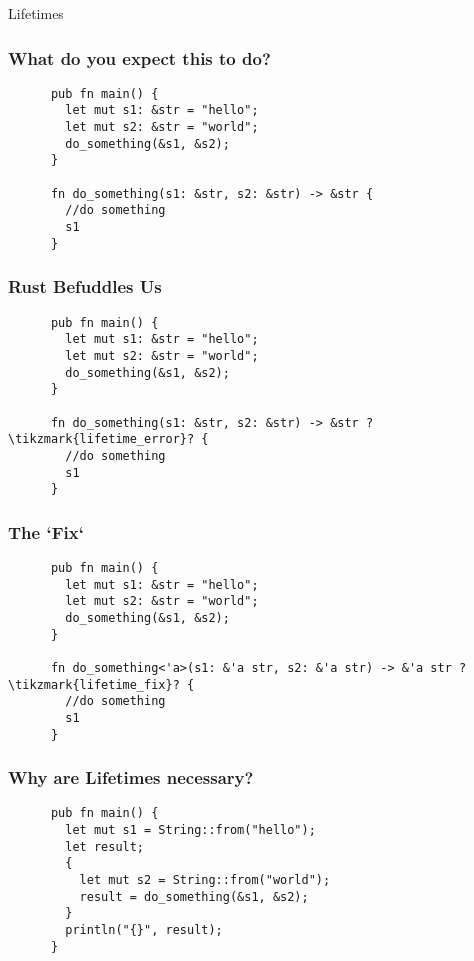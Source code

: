 \begin{section}{Lifetimes}
  \begin{frame}[fragile]
    \frametitle{What do you expect this to do?}
    \begin{verbatim}
      pub fn main() {
        let mut s1: &str = "hello";
        let mut s2: &str = "world";
        do_something(&s1, &s2);
      }

      fn do_something(s1: &str, s2: &str) -> &str {
        //do something
        s1
      }
    \end{verbatim}
  \end{frame}


  \begin{frame}[fragile]
    \frametitle{Rust Befuddles Us}
    \begin{verbatim}
      pub fn main() {
        let mut s1: &str = "hello";
        let mut s2: &str = "world";
        do_something(&s1, &s2);
      }

      fn do_something(s1: &str, s2: &str) -> &str ?\tikzmark{lifetime_error}? {
        //do something
        s1
      }
    \end{verbatim}
  \end{frame}

  \begin{frame}[fragile]
    \frametitle{The `Fix`}
    \begin{verbatim}
      pub fn main() {
        let mut s1: &str = "hello";
        let mut s2: &str = "world";
        do_something(&s1, &s2);
      }

      fn do_something<'a>(s1: &'a str, s2: &'a str) -> &'a str ?\tikzmark{lifetime_fix}? {
        //do something
        s1
      }
    \end{verbatim}
  \end{frame}

    \begin{frame}[fragile]
    \frametitle{Why are Lifetimes necessary?}
    \begin{verbatim}
      pub fn main() {
        let mut s1 = String::from("hello");
        let result;
        {
          let mut s2 = String::from("world");
          result = do_something(&s1, &s2);
        }
        println("{}", result);
      }


\end{verbatim}
\end{frame}
\end{section}
